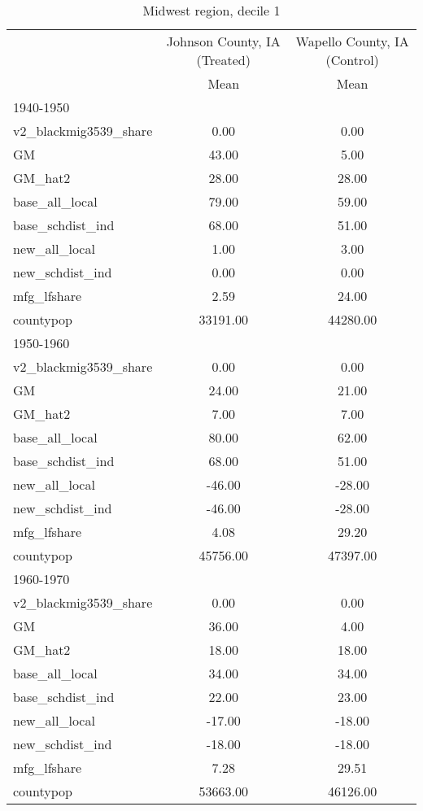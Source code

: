 \begin{table}[htbp]\centering
\def\sym#1{\ifmmode^{#1}\else\(^{#1}\)\fi}
\caption{Midwest region, decile 1 \label{tab1}}
\begin{tabular}{l*{2}{c}}
\toprule
                    &\multicolumn{1}{c}{Johnson County, IA (Treated)}&\multicolumn{1}{c}{Wapello County, IA (Control)}\\
                    &        Mean&        Mean\\
\midrule
1940-1950           &            &            \\
v2\_blackmig3539\_share&        0.00&        0.00\\
GM                  &       43.00&        5.00\\
GM\_hat2             &       28.00&       28.00\\
base\_all\_local      &       79.00&       59.00\\
base\_schdist\_ind    &       68.00&       51.00\\
new\_all\_local       &        1.00&        3.00\\
new\_schdist\_ind     &        0.00&        0.00\\
mfg\_lfshare         &        2.59&       24.00\\
countypop           &    33191.00&    44280.00\\
\midrule
1950-1960           &            &            \\
v2\_blackmig3539\_share&        0.00&        0.00\\
GM                  &       24.00&       21.00\\
GM\_hat2             &        7.00&        7.00\\
base\_all\_local      &       80.00&       62.00\\
base\_schdist\_ind    &       68.00&       51.00\\
new\_all\_local       &      -46.00&      -28.00\\
new\_schdist\_ind     &      -46.00&      -28.00\\
mfg\_lfshare         &        4.08&       29.20\\
countypop           &    45756.00&    47397.00\\
\midrule
1960-1970           &            &            \\
v2\_blackmig3539\_share&        0.00&        0.00\\
GM                  &       36.00&        4.00\\
GM\_hat2             &       18.00&       18.00\\
base\_all\_local      &       34.00&       34.00\\
base\_schdist\_ind    &       22.00&       23.00\\
new\_all\_local       &      -17.00&      -18.00\\
new\_schdist\_ind     &      -18.00&      -18.00\\
mfg\_lfshare         &        7.28&       29.51\\
countypop           &    53663.00&    46126.00\\
\bottomrule
\end{tabular}
\end{table}
